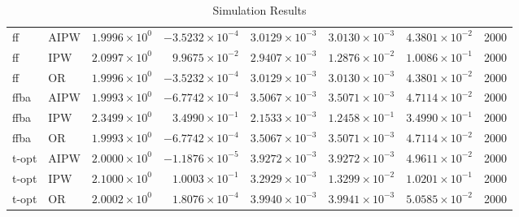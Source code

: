 \begin{table}[ht]
\begin{tabular}{llrrrrrr}
   \midrule
ff & AIPW & $1.9996 \times 10^{0}$ & $-3.5232 \times 10^{-4}$ & $3.0129 \times 10^{-3}$ & $3.0130 \times 10^{-3}$ & $4.3801 \times 10^{-2}$ & 2000 \\ 
  ff & IPW & $2.0997 \times 10^{0}$ & $9.9675 \times 10^{-2}$ & $2.9407 \times 10^{-3}$ & $1.2876 \times 10^{-2}$ & $1.0086 \times 10^{-1}$ & 2000 \\ 
  ff & OR & $1.9996 \times 10^{0}$ & $-3.5232 \times 10^{-4}$ & $3.0129 \times 10^{-3}$ & $3.0130 \times 10^{-3}$ & $4.3801 \times 10^{-2}$ & 2000 \\ 
   \midrule
ffba & AIPW & $1.9993 \times 10^{0}$ & $-6.7742 \times 10^{-4}$ & $3.5067 \times 10^{-3}$ & $3.5071 \times 10^{-3}$ & $4.7114 \times 10^{-2}$ & 2000 \\ 
  ffba & IPW & $2.3499 \times 10^{0}$ & $3.4990 \times 10^{-1}$ & $2.1533 \times 10^{-3}$ & $1.2458 \times 10^{-1}$ & $3.4990 \times 10^{-1}$ & 2000 \\ 
  ffba & OR & $1.9993 \times 10^{0}$ & $-6.7742 \times 10^{-4}$ & $3.5067 \times 10^{-3}$ & $3.5071 \times 10^{-3}$ & $4.7114 \times 10^{-2}$ & 2000 \\ 
   \midrule
t-opt & AIPW & $2.0000 \times 10^{0}$ & $-1.1876 \times 10^{-5}$ & $3.9272 \times 10^{-3}$ & $3.9272 \times 10^{-3}$ & $4.9611 \times 10^{-2}$ & 2000 \\ 
  t-opt & IPW & $2.1000 \times 10^{0}$ & $1.0003 \times 10^{-1}$ & $3.2929 \times 10^{-3}$ & $1.3299 \times 10^{-2}$ & $1.0201 \times 10^{-1}$ & 2000 \\ 
  t-opt & OR & $2.0002 \times 10^{0}$ & $1.8076 \times 10^{-4}$ & $3.9940 \times 10^{-3}$ & $3.9941 \times 10^{-3}$ & $5.0585 \times 10^{-2}$ & 2000 \\ 
   \bottomrule
\end{tabular}
\caption{Simulation Results} 
\label{tab:results}
\end{table}
